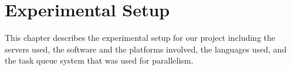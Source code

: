 \chapter{Experimental Setup}
This chapter describes the experimental setup for our project including the servers used, the software and the platforms involved, the languages used, and the task queue system that was used for parallelism.




